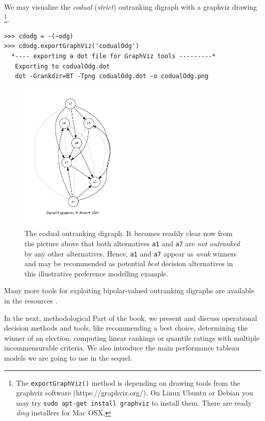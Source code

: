 We may visualize the \emph{codual} ({\em strict\/}) outranking digraph with a graphviz drawing \footnote{The \texttt{exportGraphViz()} method is depending on drawing tools from the graphviz software (https://graphviz.org/). On Linux Ubuntu or Debian you may try \texttt{sudo apt-get install graphviz} to install them. There are ready \emph{dmg} installers for Mac OSX.}.
\begin{lstlisting}
>>> cdodg = -(~odg)
>>> cdodg.exportGraphViz('codualOdg')
  *---- exporting a dot file for GraphViz tools ---------*
   Exporting to codualOdg.dot
   dot -Grankdir=BT -Tpng codualOdg.dot -o codualOdg.png
\end{lstlisting}
\begin{figure}[h]
\sidecaption[t]
\includegraphics[width=5cm]{Figures/3-1-codualOdg.pdf}
\caption{The codual outranking digraph. It becomes readily clear now from the picture above that both alternatives \texttt{a1}  and \texttt{a7} are {\em not outranked\/} by any other alternatives. Hence, \texttt{a1}  and \texttt{a7} appear as \emph{weak} \Condorcet winners and may be recommended as potential \emph{best} decision alternatives in this illustrative preference modelling example.}
\label{fig:3.1}       %
\end{figure}
 
Many more tools for exploiting bipolar-valued outranking digraphs are available in the \Digraph resources \citep{BIS-2021}.
\vspace{1cm}

In the next, methodological Part of the book, we present and discuss operational decision methods and tools, like recommending a best choice, determining the winner of an election, computing linear rankings or  quantile ratings with multiple incommensurable criteria. We also introduce the main performance tableau models we are going to use in the sequel. 

